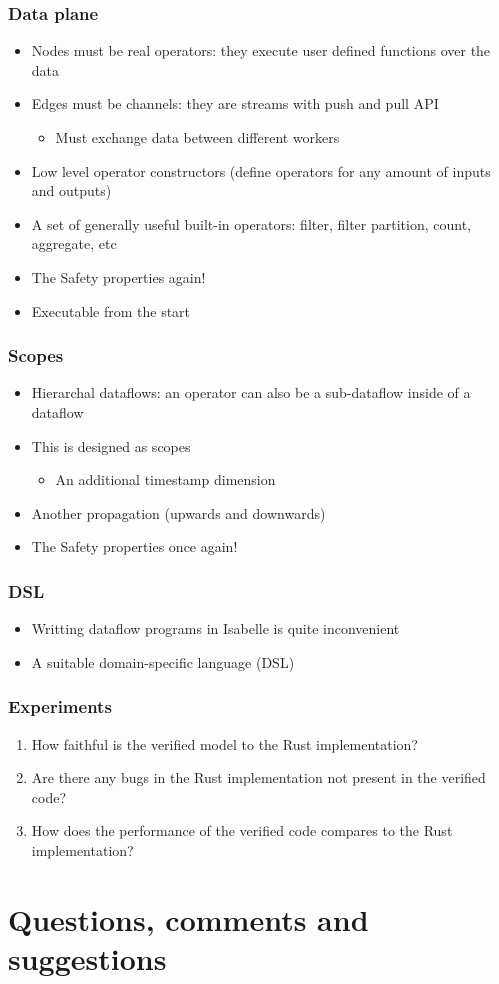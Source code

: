 \documentclass{beamer}
\begin{document}
\begin{frame}
  \frametitle{Data plane}
  \begin{itemize}
    \item Nodes must be real operators: they execute user defined functions over the data
    \item Edges must be channels: they are streams with push and pull API
          \begin{itemize}
            \item Must exchange data between different workers
          \end{itemize}
    \item Low level operator constructors (define operators for any amount of inputs and outputs)
    \item A set of generally useful built-in operators: filter, filter partition, count, aggregate, etc
    \item The Safety properties again!
    \item Executable from the start
  \end{itemize}
\end{frame}

\begin{frame}
  \frametitle{Scopes}
  \begin{itemize}
    \item Hierarchal dataflows: an operator can also be a sub-dataflow inside of a dataflow
    \item This is designed as scopes
          \begin{itemize}
            \item An additional timestamp dimension
          \end{itemize}
    \item Another propagation (upwards and downwards)
    \item The Safety properties once again!
  \end{itemize}
\end{frame}

\begin{frame}
  \frametitle{DSL}
  \begin{itemize}
    \item Writting dataflow programs in Isabelle is quite inconvenient
    \item A suitable domain-specific language (DSL)
  \end{itemize}
\end{frame}

\begin{frame}
  \frametitle{Experiments}
  \begin{enumerate}
    \item How faithful is the verified model to the Rust implementation?
    \item Are there any bugs in the Rust implementation not present in the verified code?
    \item How does the performance of the verified code compares to the Rust implementation?
  \end{enumerate}
\end{frame}

\section{Questions, comments and suggestions}
\end{document}
